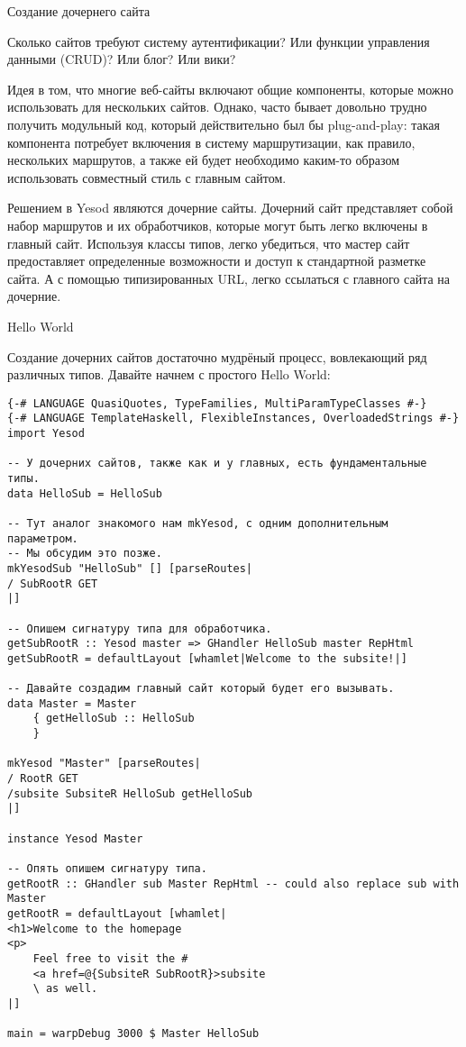 Создание дочернего сайта

Сколько сайтов требуют систему аутентификации? Или функции управления данными (CRUD)? Или блог? Или вики?

Идея в том, что многие веб-сайты включают общие компоненты, которые можно использовать для нескольких сайтов. Однако, часто бывает довольно трудно получить модульный код, который действительно был бы plug-and-play: такая компонента потребует включения в систему маршрутизации, как правило, нескольких маршрутов, а также ей будет необходимо каким-то образом использовать совместный стиль с главным сайтом.

Решением в Yesod являются дочерние сайты. Дочерний сайт представляет собой набор маршрутов и их обработчиков, которые могут быть легко включены в главный сайт. Используя классы типов, легко убедиться, что мастер сайт предоставляет определенные возможности и доступ к стандартной разметке сайта. А с помощью типизированных URL, легко ссылаться с главного сайта на дочерние.

Hello World

Создание дочерних сайтов достаточно мудрёный процесс, вовлекающий ряд различных типов. Давайте начнем с простого Hello World:

\begin{lstlisting}
{-# LANGUAGE QuasiQuotes, TypeFamilies, MultiParamTypeClasses #-}
{-# LANGUAGE TemplateHaskell, FlexibleInstances, OverloadedStrings #-}
import Yesod

-- У дочерних сайтов, также как и у главных, есть фундаментальные типы.
data HelloSub = HelloSub

-- Тут аналог знакомого нам mkYesod, с одним дополнительным параметром.
-- Мы обсудим это позже.
mkYesodSub "HelloSub" [] [parseRoutes|
/ SubRootR GET
|]

-- Опишем сигнатуру типа для обработчика.
getSubRootR :: Yesod master => GHandler HelloSub master RepHtml
getSubRootR = defaultLayout [whamlet|Welcome to the subsite!|]

-- Давайте создадим главный сайт который будет его вызывать.
data Master = Master
    { getHelloSub :: HelloSub
    }

mkYesod "Master" [parseRoutes|
/ RootR GET
/subsite SubsiteR HelloSub getHelloSub
|]

instance Yesod Master

-- Опять опишем сигнатуру типа.
getRootR :: GHandler sub Master RepHtml -- could also replace sub with Master
getRootR = defaultLayout [whamlet|
<h1>Welcome to the homepage
<p>
    Feel free to visit the #
    <a href=@{SubsiteR SubRootR}>subsite
    \ as well.
|]

main = warpDebug 3000 $ Master HelloSub
\end{lstlisting}

